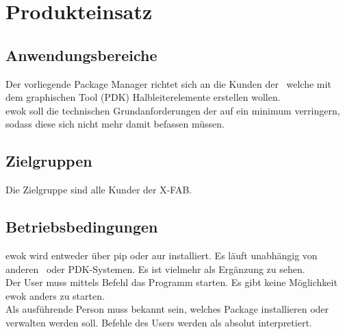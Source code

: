 \chapter{Produkteinsatz}

\section{Anwendungsbereiche}
Der vorliegende Package Manager richtet sich an die Kunden der \x~welche mit dem graphischen Tool (PDK) Halbleiterelemente erstellen wollen. \\
ewok soll die technischen Grundanforderungen der  auf ein minimum verringern, sodass diese sich nicht mehr damit befassen müssen.

\section{Zielgruppen}
Die Zielgruppe sind alle Kunder der X-FAB.


\section{Betriebsbedingungen}
ewok wird entweder über pip oder aur installiert. Es läuft unabhängig von anderen \x~oder PDK-Systemen. Es ist vielmehr als Ergänzung zu sehen.\\
Der User muss mittels Befehl das Programm starten. Es gibt keine Möglichkeit ewok anders zu starten.\\
Als ausführende Person muss bekannt sein, welches Package installieren oder verwalten werden soll. Befehle des Users werden als absolut interpretiert. 